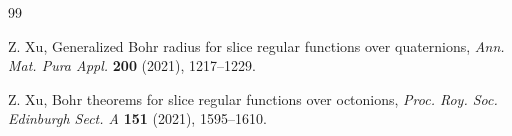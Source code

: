 \documentclass[a4paper,11pt, reqno]{amsart}
\theoremstyle{definition}
\begin{document}
\begin{thebibliography}{99}
	
	
	 {\sc Z. Xu}, Generalized Bohr radius for slice regular functions over quaternions,  {\it Ann. Mat. Pura
		Appl.}  {\bf 200} (2021), 1217--1229.
	
	 {\sc Z. Xu}, Bohr theorems for slice regular functions over octonions,  {\it Proc. Roy. Soc. Edinburgh Sect. A}  {\bf 151} (2021), 1595--1610.
	
	
\end{thebibliography}
\end{document}
